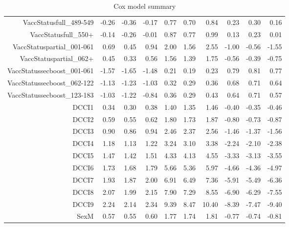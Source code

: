 \begin{table}[ht]
\begin{tabular}{rrrrrrrrrr}
  VaccStatusfull\_489-549 & -0.26 & -0.36 & -0.17 & 0.77 & 0.70 & 0.84 & 0.23 & 0.30 & 0.16 \\ 
  VaccStatusfull\_550+ & -0.14 & -0.26 & -0.01 & 0.87 & 0.77 & 0.99 & 0.13 & 0.23 & 0.01 \\ 
  VaccStatuspartial\_001-061 & 0.69 & 0.45 & 0.94 & 2.00 & 1.56 & 2.55 & -1.00 & -0.56 & -1.55 \\ 
  VaccStatuspartial\_062+ & 0.45 & 0.33 & 0.56 & 1.56 & 1.39 & 1.75 & -0.56 & -0.39 & -0.75 \\ 
  VaccStatussecboost\_001-061 & -1.57 & -1.65 & -1.48 & 0.21 & 0.19 & 0.23 & 0.79 & 0.81 & 0.77 \\ 
  VaccStatussecboost\_062-122 & -1.13 & -1.23 & -1.03 & 0.32 & 0.29 & 0.36 & 0.68 & 0.71 & 0.64 \\ 
  VaccStatussecboost\_123-183 & -1.03 & -1.22 & -0.84 & 0.36 & 0.29 & 0.43 & 0.64 & 0.71 & 0.57 \\ 
  DCCI1 & 0.34 & 0.30 & 0.38 & 1.40 & 1.35 & 1.46 & -0.40 & -0.35 & -0.46 \\ 
  DCCI2 & 0.59 & 0.55 & 0.62 & 1.80 & 1.73 & 1.87 & -0.80 & -0.73 & -0.87 \\ 
  DCCI3 & 0.90 & 0.86 & 0.94 & 2.46 & 2.37 & 2.56 & -1.46 & -1.37 & -1.56 \\ 
  DCCI4 & 1.18 & 1.13 & 1.22 & 3.24 & 3.10 & 3.38 & -2.24 & -2.10 & -2.38 \\ 
  DCCI5 & 1.47 & 1.42 & 1.51 & 4.33 & 4.13 & 4.55 & -3.33 & -3.13 & -3.55 \\ 
  DCCI6 & 1.73 & 1.68 & 1.79 & 5.66 & 5.36 & 5.97 & -4.66 & -4.36 & -4.97 \\ 
  DCCI7 & 1.93 & 1.87 & 2.00 & 6.91 & 6.49 & 7.36 & -5.91 & -5.49 & -6.36 \\ 
  DCCI8 & 2.07 & 1.99 & 2.15 & 7.90 & 7.29 & 8.55 & -6.90 & -6.29 & -7.55 \\ 
  DCCI9 & 2.24 & 2.14 & 2.34 & 9.39 & 8.47 & 10.40 & -8.39 & -7.47 & -9.40 \\ 
  SexM & 0.57 & 0.55 & 0.60 & 1.77 & 1.74 & 1.81 & -0.77 & -0.74 & -0.81 \\ 
   \hline
\end{tabular}
\caption{Cox model summary} 
\end{table}
